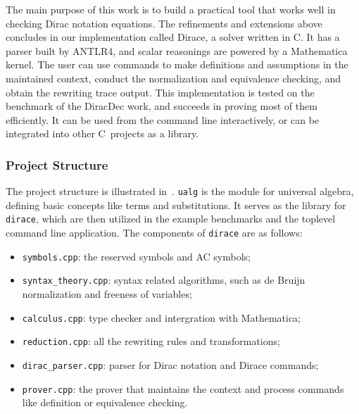 \documentclass[runningheads]{llncs}
\newcommand{\CC}{C\nolinebreak\hspace{-.05em}\raisebox{.4ex}{\tiny\bf +}\nolinebreak\hspace{-.10em}\raisebox{.4ex}{\tiny\bf +}}
\def\CC{{C\nolinebreak[4]\hspace{-.05em}\raisebox{.4ex}{\tiny\bf ++}}}
\begin{document}
The main purpose of this work is to build a practical tool that works well in checking Dirac notation equations. The refinements and extensions above concludes in our implementation called Dirace, a solver written in \CC. It has a parser built by ANTLR4, and scalar reasonings are powered by a Mathematica kernel. The user can use commands to make definitions and assumptions in the maintained context, conduct the normalization and equivalence checking, and obtain the rewriting trace output. This implementation 
is tested on the benchmark of the DiracDec work, and succeeds in proving most of them efficiently. 
It can be used from the command line interactively, or can be integrated into other \CC\ projects as a library.

\subsubsection{Project Structure}
The project structure is illustrated in~.
\texttt{ualg} is the module for universal algebra, defining basic concepts like terms and substitutions. It serves as the library for \texttt{dirace}, which are then utilized in the example benchmarks and the toplevel command line application. The components of \texttt{dirace} are as follows:
\begin{itemize}
    \item \texttt{symbols.cpp}: the reserved symbols and AC symbols;
    \item \texttt{syntax\_theory.cpp}: syntax related algorithms, such as de Bruijn normalization and freeness of variables;
    \item \texttt{calculus.cpp}: type checker and intergration with Mathematica;
    \item \texttt{reduction.cpp}: all the rewriting rules and transformations;
    \item \texttt{dirac\_parser.cpp}: parser for Dirac notation and Dirace commands;
    \item \texttt{prover.cpp}: the prover that maintains the context and process commands like definition or equivalence checking.
\end{itemize}


\end{document}
